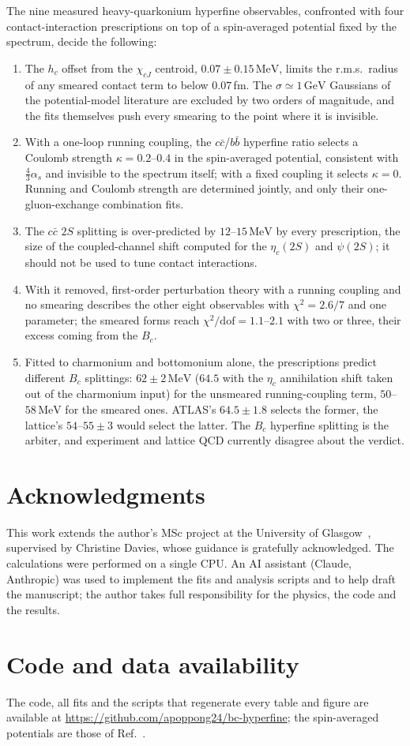\documentclass[10pt,twocolumn]{article}
\newenvironment{acknowledgments}{\section*{Acknowledgments}}{}
\newcommand{\Bc}{B_c}
\newcommand{\cc}{c\bar c}
\newcommand{\bb}{b\bar b}
\newcommand{\MeV}{\,\mathrm{MeV}}
\newcommand{\GeV}{\,\mathrm{GeV}}
\begin{document}
The nine measured heavy-quarkonium hyperfine observables, confronted with four contact-interaction prescriptions on top of a spin-averaged potential fixed by the spectrum, decide the following:
\begin{enumerate}
\item The $h_c$ offset from the $\chi_{cJ}$ centroid, $0.07\pm0.15\MeV$, limits the r.m.s.\ radius of any smeared contact term to below $0.07\,$fm. The $\sigma\simeq1\GeV$ Gaussians of the potential-model literature are excluded by two orders of magnitude, and the fits themselves push every smearing to the point where it is invisible.
\item With a one-loop running coupling, the $\cc$/$\bb$ hyperfine ratio selects a Coulomb strength $\kappa=0.2$--$0.4$ in the spin-averaged potential, consistent with $\tfrac43\alpha_s$ and invisible to the spectrum itself; with a fixed coupling it selects $\kappa=0$. Running and Coulomb strength are determined jointly, and only their one-gluon-exchange combination fits.
\item The $\cc$ $2S$ splitting is over-predicted by $12$--$15\MeV$ by every prescription, the size of the coupled-channel shift computed for the $\eta_c(2S)$ and $\psi(2S)$; it should not be used to tune contact interactions.
\item With it removed, first-order perturbation theory with a running coupling and no smearing describes the other eight observables with $\chi^2=2.6/7$ and one parameter; the smeared forms reach $\chi^2/\mathrm{dof}=1.1$--$2.1$ with two or three, their excess coming from the $\Bc$.
\item Fitted to charmonium and bottomonium alone, the prescriptions predict different $\Bc$ splittings: $62\pm2\MeV$ ($64.5$ with the $\eta_c$ annihilation shift taken out of the charmonium input) for the unsmeared running-coupling term, $50$--$58\MeV$ for the smeared ones. ATLAS's $64.5\pm1.8$ selects the former, the lattice's $54$--$55\pm3$ would select the latter. The $\Bc$ hyperfine splitting is the arbiter, and experiment and lattice QCD currently disagree about the verdict.
\end{enumerate}

\begin{acknowledgments}
This work extends the author's MSc project at the University of Glasgow~\cite{OppongThesis}, supervised by Christine Davies, whose guidance is gratefully acknowledged.
The calculations were performed on a single CPU.
An AI assistant (Claude, Anthropic) was used to implement the fits and analysis scripts and to help draft the manuscript; the author takes full responsibility for the physics, the code and the results.
\end{acknowledgments}

\section*{Code and data availability}
The code, all fits and the scripts that regenerate every table and figure are available at \url{https://github.com/apoppong24/bc-hyperfine}; the spin-averaged potentials are those of Ref.~\cite{Oppong2026b}.



\end{document}
